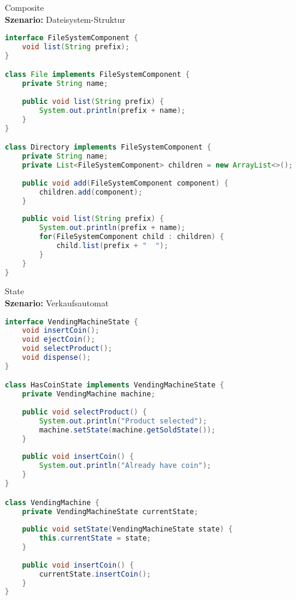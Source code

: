 \begin{example2}{Composite}\\
\textbf{Szenario:} Dateisystem-Struktur
\begin{lstlisting}[language=Java, style=base]
interface FileSystemComponent {
    void list(String prefix);
}

class File implements FileSystemComponent {
    private String name;
    
    public void list(String prefix) {
        System.out.println(prefix + name);
    }
}

class Directory implements FileSystemComponent {
    private String name;
    private List<FileSystemComponent> children = new ArrayList<>();
    
    public void add(FileSystemComponent component) {
        children.add(component);
    }
    
    public void list(String prefix) {
        System.out.println(prefix + name);
        for(FileSystemComponent child : children) {
            child.list(prefix + "  ");
        }
    }
}
\end{lstlisting}
\end{example2}

\begin{example2}{State}\\
\textbf{Szenario:} Verkaufsautomat
\begin{lstlisting}[language=Java, style=base]
interface VendingMachineState {
    void insertCoin();
    void ejectCoin();
    void selectProduct();
    void dispense();
}

class HasCoinState implements VendingMachineState {
    private VendingMachine machine;
    
    public void selectProduct() {
        System.out.println("Product selected");
        machine.setState(machine.getSoldState());
    }
    
    public void insertCoin() {
        System.out.println("Already have coin");
    }
}

class VendingMachine {
    private VendingMachineState currentState;
    
    public void setState(VendingMachineState state) {
        this.currentState = state;
    }
    
    public void insertCoin() {
        currentState.insertCoin();
    }
}
\end{lstlisting}
\end{example2}

